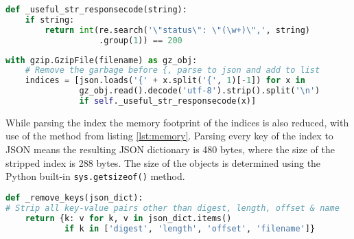 \begin{lstlisting}[language=Python, caption=Regex solution]
def _useful_str_responsecode(string):
    if string:
        return int(re.search('\"status\": \"(\w+)\",', string)
                   .group(1)) == 200
\end{lstlisting}


\begin{lstlisting}[language=Python, caption=List comprehension creating list of indices, label={lst:comprehension}]
with gzip.GzipFile(filename) as gz_obj:
    # Remove the garbage before {, parse to json and add to list
    indices = [json.loads('{' + x.split('{', 1)[-1]) for x in
               gz_obj.read().decode('utf-8').strip().split('\n')
               if self._useful_str_responsecode(x)]
\end{lstlisting}


While parsing the index the memory footprint of the indices is also reduced, with use of the method from listing \ref{lst:memory}. Parsing every key of the index to JSON means the resulting JSON dictionary is 480 bytes, where the size of the stripped index is 288 bytes. The size of the objects is determined using the Python built-in \texttt{sys.getsizeof()} method. 

\begin{lstlisting}[language=Python, caption=Reducing memory footprint, label={lst:memory}]
def _remove_keys(json_dict):
# Strip all key-value pairs other than digest, length, offset & name
    return {k: v for k, v in json_dict.items()
            if k in ['digest', 'length', 'offset', 'filename']}
\end{lstlisting}
